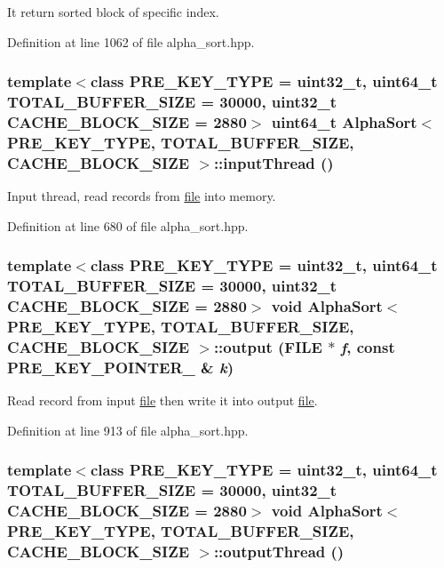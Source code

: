 It return sorted block of specific index. 

Definition at line 1062 of file alpha\_\-sort.hpp.\hypertarget{classAlphaSort_ac314e6bba6bb9e5ddc27d4470857f73}{
\subsubsection[{inputThread}]{\setlength{\rightskip}{0pt plus 5cm}template$<$class PRE\_\-KEY\_\-TYPE  = uint32\_\-t, uint64\_\-t TOTAL\_\-BUFFER\_\-SIZE = 30000, uint32\_\-t CACHE\_\-BLOCK\_\-SIZE = 2880$>$ uint64\_\-t {\bf AlphaSort}$<$ PRE\_\-KEY\_\-TYPE, TOTAL\_\-BUFFER\_\-SIZE, CACHE\_\-BLOCK\_\-SIZE $>$::inputThread ()}}
\label{classAlphaSort_ac314e6bba6bb9e5ddc27d4470857f73}


Input thread, read records from \hyperlink{classfile}{file} into memory. 

Definition at line 680 of file alpha\_\-sort.hpp.\hypertarget{classAlphaSort_3a270f6e30d4b258faecfa34db9b1822}{
\subsubsection[{output}]{\setlength{\rightskip}{0pt plus 5cm}template$<$class PRE\_\-KEY\_\-TYPE  = uint32\_\-t, uint64\_\-t TOTAL\_\-BUFFER\_\-SIZE = 30000, uint32\_\-t CACHE\_\-BLOCK\_\-SIZE = 2880$>$ void {\bf AlphaSort}$<$ PRE\_\-KEY\_\-TYPE, TOTAL\_\-BUFFER\_\-SIZE, CACHE\_\-BLOCK\_\-SIZE $>$::output (FILE $\ast$ {\em f}, \/  const PRE\_\-KEY\_\-POINTER\_\- \& {\em k})}}
\label{classAlphaSort_3a270f6e30d4b258faecfa34db9b1822}


Read record from input \hyperlink{classfile}{file} then write it into output \hyperlink{classfile}{file}. 

Definition at line 913 of file alpha\_\-sort.hpp.\hypertarget{classAlphaSort_5bd32d6f34286a1ae0ccfec3b18b0a11}{
\subsubsection[{outputThread}]{\setlength{\rightskip}{0pt plus 5cm}template$<$class PRE\_\-KEY\_\-TYPE  = uint32\_\-t, uint64\_\-t TOTAL\_\-BUFFER\_\-SIZE = 30000, uint32\_\-t CACHE\_\-BLOCK\_\-SIZE = 2880$>$ void {\bf AlphaSort}$<$ PRE\_\-KEY\_\-TYPE, TOTAL\_\-BUFFER\_\-SIZE, CACHE\_\-BLOCK\_\-SIZE $>$::outputThread ()}}
\label{classAlphaSort_5bd32d6f34286a1ae0ccfec3b18b0a11}



